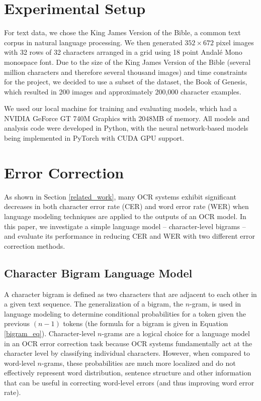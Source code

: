 \documentclass[10pt,twocolumn,letterpaper]{article}
\begin{document}
\section{Experimental Setup}
\label{exp_setup}

For text data, we chose the King James Version of the Bible, a
common text corpus in natural language processing. We then
generated $352 \times 672$ pixel images with 32 rows
of 32 characters arranged in a grid using 18 point Andal\'{e}
Mono monospace font. Due to the size of the King James Version of
the Bible (several million characters and therefore several thousand
images) and time constraints for the project, we decided to use a
subset of the dataset, the Book of Genesis, which resulted in 200 images
and approximately 200,000 character examples.

We used our local machine for training and evaluating models,
which had a NVIDIA GeForce GT 740M Graphics with 2048MB of memory.
All models and analysis code were developed in Python, with the
neural network-based models being implemented in PyTorch with CUDA
GPU support.



\section{Error Correction}
\label{error_correction}
As shown in Section \ref{related_work}, many OCR systems exhibit significant
decreases in both character error rate (CER) and word error rate (WER)
when language modeling techniques are applied to the outputs of an OCR
model. In this paper, we investigate a simple language model --
character-level bigrams -- and evaluate its performance in reducing CER
and WER with two different error correction methods.

\subsection{Character Bigram Language Model}

A character bigram is defined as two characters that are adjacent to
each other in a given text sequence. The generalization of a bigram,
the $n$-gram, is used in language modeling to determine conditional
probabilities for a token given the previous $(n - 1)$ tokens (the
formula for a bigram is given in Equation \ref{bigram_eq}).
Character-level $n$-grams are a logical choice for a language model
in an OCR error correction task because OCR systems fundamentally act
at the character level by classifying individual characters. However,
when compared to word-level $n$-grams, these probabilities are much
more localized and do not effectively represent word distribution,
sentence structure and other information that can be useful in correcting
word-level errors (and thus improving word error rate).
\end{document}
